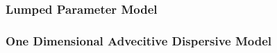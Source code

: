

\clearpage

\subsubsection{Lumped Parameter Model}



\clearpage

\subsubsection{One Dimensional Advecitive Dispersive Model}



